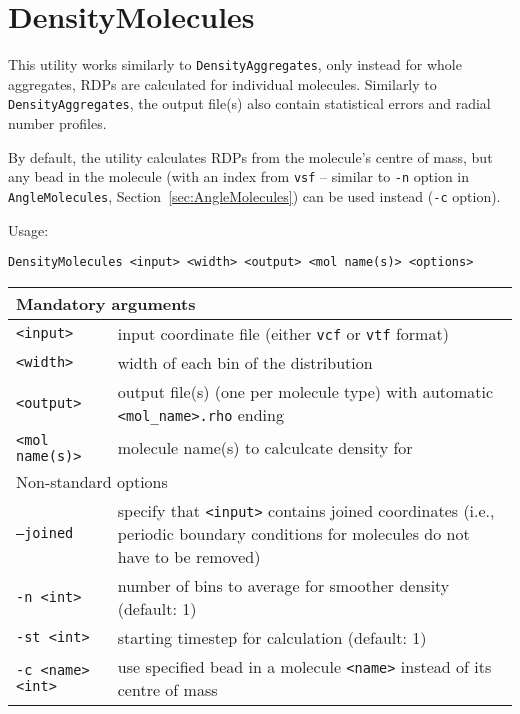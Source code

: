 \section{DensityMolecules} \label{sec:DensityMolecules}

This utility works similarly to \texttt{DensityAggregates}, only instead
for whole aggregates, RDPs are calculated for individual molecules.
Similarly to \texttt{DensityAggregates}, the output file(s) also contain
statistical errors and radial number profiles.

By default, the utility calculates RDPs from the molecule's centre of mass,
but any bead in the molecule (with an index from \texttt{vsf} -- similar to
\texttt{-n} option in \texttt{AngleMolecules},
Section~\ref{sec:AngleMolecules}) can be used instead (\texttt{-c} option).

Usage:

\vspace{1em}
\noindent
\texttt{DensityMolecules <input> <width> <output> <mol name(s)> <options>}

\noindent
\begin{longtable}{p{}p{}}
  \toprule
  \multicolumn{2}{l}{Mandatory arguments} \\
  \midrule
  \texttt{<input>} & input coordinate file (either \texttt{vcf} or
    \texttt{vtf} format) \\
  \texttt{<width>} & width of each bin of the distribution \\
  \texttt{<output>} & output file(s) (one per molecule type) with
    automatic \texttt{<mol\_name>.rho} ending \\
  \texttt{<mol name(s)>} & molecule name(s) to calculcate density for \\
  \toprule
  \multicolumn{2}{l}{Non-standard options} \\
  \midrule
  \texttt{--joined} & specify that \texttt{<input>} contains joined
    coordinates (i.e., periodic boundary conditions for molecules do not
    have to be removed) \\
  \texttt{-n <int>} & number of bins to average for smoother density
    (default: 1) \\
  \texttt{-st <int>} & starting timestep for calculation (default: 1) \\
  \texttt{-c <name> <int>} & use specified bead in a molecule
    \texttt{<name>} instead of its centre of mass \\
  \bottomrule
\end{longtable}

